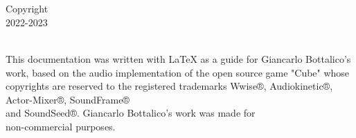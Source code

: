 
\thispagestyle{empty}

\hfill


\begin{center}
\myName \\
\smallskip
\textit{\myTitle}\\
\smallskip
Copyright \ccbyncsa\\
2022-2023
\end{center}

\medskip

\noindent\textsf{} \\
\noindent
This documentation was written with \LaTeX{} as a guide for Giancarlo Bottalico's work, based on the audio implementation of the open source game "Cube" whose copyrights are reserved to the registered trademarks Wwise®, Audiokinetic®, Actor-Mixer®, SoundFrame® \\
and SoundSeed®. Giancarlo Bottalico's work was made for \\
non-commercial purposes.

\bigskip


\bigskip

\noindent
\textsf{}

\noindent
{}\,

